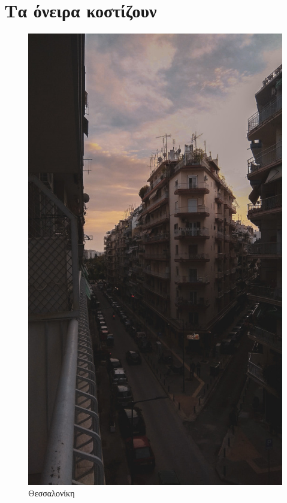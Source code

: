 \documentclass[oneside]{book}
\begin{document}
    

    
    
    \tableofcontents
    
    \chapter{Τα όνειρα κοστίζουν}
    
    \lipsum[1]

    \begin{figure}[H]
        \includegraphics[scale=0.2]{images/skg.jpg}
        \caption{Θεσσαλονίκη}
        \label{fig:skg}
    \end{figure}
\end{document}

